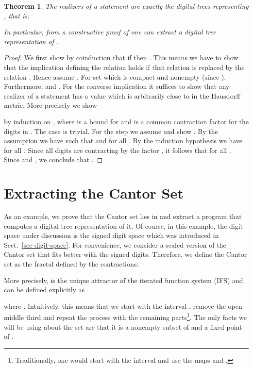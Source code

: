 \documentclass[microtype]{jloganal}
\theoremstyle{plain}
\newtheorem{theorem}{Theorem}[section]
\theoremstyle{definition}
\begin{document}
\begin{theorem}
\label{thm-coco-compact-real}
The realizers of a statement  are exactly the 
digital trees representing , that is: 

In particular, from a constructive proof of  one 
can extract a digital tree representation of .
\end{theorem}
\begin{proof}
We first show by coinduction that if  then 
.
This means we have to show that the implication defining 
the relation  holds if that relation
is replaced by the relation .
Hence assume . 
For  set 
 which is compact and nonempty (since ).
Furthermore,  and
.
For the converse implication it suffices to show that any realizer
of a statement  has a value which is arbitrarily 
close to  in the Hausdorff metric. More precisely we show

by induction on , where  is a bound for  and  is a common 
contraction factor for the digits in . 
The case  is trivial. 
For the step we assume  and show 
.
By the assumption we have 
 such that
 and 
 for all .
By the induction hypothesis we have 
 for all .
Since all digits are contracting by the factor , it follows that
 for all 
. 
Since  and
, we conclude that
.
\end{proof}

\section{Extracting the Cantor Set}
\label{sec-cantor}
As an example, we prove that the Cantor set  
lies in  and extract a program
that computes a digital tree representation of it.
Of course, in this example, the digit space under discussion is the signed
digit space  which was introduced in Sect.~\ref{sec-digit-space}.
For convenience, we consider a scaled version of the Cantor set 
that fits better with
the signed digits. Therefore, we define the Cantor set 
as the fractal defined by the contractions: 

More precisely,  is the unique attractor of the iterated 
function system (IFS)  and can be defined explicitly
as

where .
Intuitively, this means that we start with the interval ,
remove the open middle third and repeat the process with the 
remaining parts\footnote{Traditionally, one would start with the interval 
and use the maps  and .}.
The only facts we will be using about the set  are that 
it is a nonempty subset of  and a fixed point of .
\end{document}
